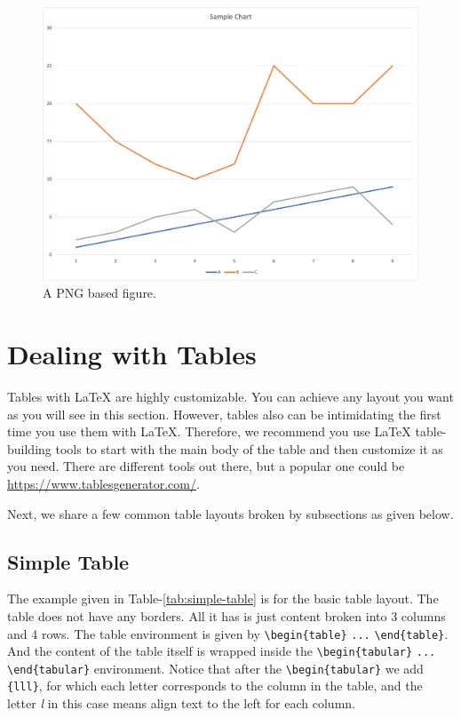 \begin{figure}[H]
    \begin{center}
        \includegraphics[width=0.5\linewidth]{figures/samples/png-sample.png}
        \caption{A PNG based figure.}
        \label{ref:png-based}
    \end{center}
\end{figure}



\section{Dealing with Tables}
\label{sec:dealing_with_tables}

Tables with {\LaTeX} are highly customizable. You can achieve any layout you want as you will see in this section. However, tables also can be intimidating the first time you use them with {\LaTeX}. Therefore, we recommend you use {\LaTeX} table-building tools to start with the main body of the table and then customize it as you need. There are different tools out there, but a popular one could be \href{https://www.tablesgenerator.com/}{https://www.tablesgenerator.com/}.

Next, we share a few common table layouts broken by subsections as given below.

\subsection{Simple Table}

The example given in Table-\ref{tab:simple-table} is for the basic table layout. The table does not have any borders. All it has is just content broken into 3 columns and 4 rows. The table environment is given by \verb|\begin{table}| \verb|...| \verb|\end{table}|. And the content of the table itself is wrapped inside the \verb|\begin{tabular}| \verb|...| \verb|\end{tabular}| environment. Notice that after the \verb|\begin{tabular}| we add \verb|{lll}|, for which each letter corresponds to the column in the table, and the letter \emph{l} in this case means align text to the left for each column.


